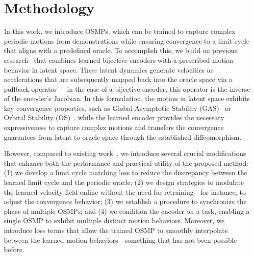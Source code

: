 \section{Methodology}\label{sec:osmp:methodology}

In this work, we introduce \glspl{OSMP}, which can be trained to capture complex periodic motions from demonstrations while ensuring convergence to a limit cycle that aligns with a predefined oracle. To accomplish this, we build on previous research~\citep{rana2020euclideanizing, zhi2024teaching} that combines learned bijective encoders with a prescribed motion behavior in latent space. These latent dynamics generate velocities or accelerations that are subsequently mapped back into the oracle space via a pullback operator~\citep{zhang2022learning}—in the case of a bijective encoder, this operator is the inverse of the encoder’s Jacobian. In this formulation, the motion in latent space exhibits key convergence properties, such as Global Asymptotic Stability (GAS)~\citep{rana2020euclideanizing, perez2023stable, sochopoulos2024learning} or Orbital Stability (OS)~\citep{zhi2024teaching}, while the learned encoder provides the necessary expressiveness to capture complex motions and transfers the convergence guarantees from latent to oracle space through the established diffeomorphism.

However, compared to existing work~\citep{zhi2024teaching}, we introduce several crucial modifications that enhance both the performance and practical utility of the proposed method: (1) we develop a limit cycle matching loss to reduce the discrepancy between the learned limit cycle and the periodic oracle; (2) we design strategies to modulate the learned velocity field online without the need for retraining—for instance, to adjust the convergence behavior; (3) we establish a procedure to synchronize the phase of multiple \glspl{OSMP}; and (4) we condition the encoder on a task, enabling a single \gls{OSMP} to exhibit multiple distinct motion behaviors. Moreover, we introduce loss terms that allow the trained \gls{OSMP} to smoothly interpolate between the learned motion behaviors—something that has not been possible before.

